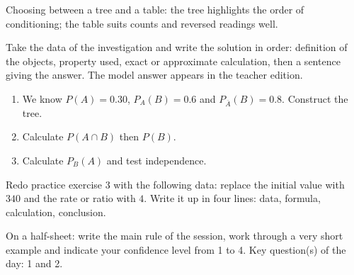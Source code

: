 \begin{traceecrite}Choosing between a tree and a table: the tree highlights the order of conditioning; the table suits counts and reversed readings well.\end{traceecrite}

\begin{exemple}
Take the data of the investigation and write the solution in order: definition of the objects, property used, exact or approximate calculation, then a sentence giving the answer. The model answer appears in the teacher edition.
\end{exemple}

\begin{exercice}[-- essential]
\begin{enumerate}\item We know $P(A)=0.30$, $P_A(B)=0.6$ and $P_{\overline A}(B)=0.8$. Construct the tree.\item Calculate $P(A\cap B)$ then $P(B)$.\item Calculate $P_B(A)$ and test independence.\end{enumerate}
\end{exercice}


\begin{dm}Redo practice exercise 3 with the following data: replace the initial value with $340$ and the rate or ratio with $4$. Write it up in four lines: data, formula, calculation, conclusion.\end{dm}

\begin{sortie}On a half-sheet: write the main rule of the session, work through a very short example and indicate your confidence level from 1 to 4. Key question(s) of the day: 1 and 2.\end{sortie}

